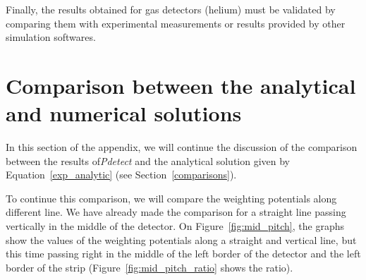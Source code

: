\documentclass[11pt]{article}
\begin{document}
		Finally, the results obtained for gas detectors (helium) must be validated
		by comparing them with experimental measurements or results provided by other
		simulation softwares.


\newpage

\appendix

\section{Comparison between the analytical and numerical solutions} \label{App:comp_an}

	In this section of the appendix, we will continue the discussion of the comparison
	between the results of\textit{Pdetect} and the analytical solution given by
	Equation~\ref{exp_analytic} (see Section~\ref{comparisons}).

	To continue this comparison, we will compare the weighting potentials along different line.
	We have already made the comparison for a straight line passing vertically in the middle of the
	detector. On Figure~\ref{fig:mid_pitch}, the graphs show the values of the weighting potentials along a
	straight and vertical line, but this time passing right in the middle of the left border of
	the detector and the left border of the strip (Figure~\ref{fig:mid_pitch_ratio} shows the ratio).
\end{document}
